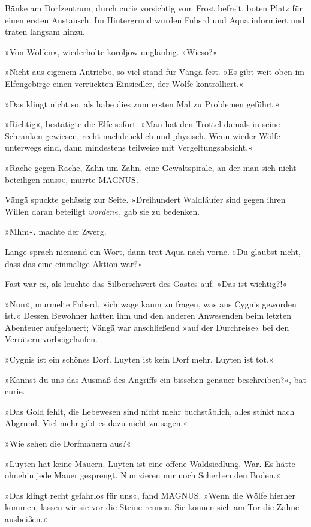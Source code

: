 Bänke am Dorfzentrum, durch curie vorsichtig vom Frost befreit, boten Platz für einen ersten Austausch. Im Hintergrund wurden Fnbsrd und Aqua informiert und traten langsam hinzu.

»Von Wölfen«, wiederholte koroljow ungläubig. »Wieso?«

»Nicht aus eigenem Antrieb«, so viel stand für Vängä fest. »Es gibt weit oben im Elfengebirge einen verrückten Einsiedler, der Wölfe kontrolliert.«

»Das klingt nicht so, als habe dies zum ersten Mal zu Problemen geführt.«

»Richtig«, bestätigte die Elfe sofort. »Man hat den Trottel damals in seine Schranken gewiesen, recht nachdrücklich und physisch. Wenn wieder Wölfe unterwegs sind, dann mindestens teilweise mit Vergeltungsabsicht.«

»Rache gegen Rache, Zahn um Zahn, eine Gewaltspirale, an der man sich nicht beteiligen muss«, murrte MAGNUS.

Vängä spuckte gehässig zur Seite. »Dreihundert Waldläufer sind gegen ihren Willen daran beteiligt \emph{worden}«, gab sie zu bedenken.

»Mhm«, machte der Zwerg.

Lange sprach niemand ein Wort, dann trat Aqua nach vorne. »Du glaubst nicht, dass das eine einmalige Aktion war?«

Fast war es, als leuchte das Silberschwert des Gastes auf. »Das ist wichtig?!«

»Nun«, murmelte Fnbsrd, »ich wage kaum zu fragen, was aus Cygnis geworden ist.« Dessen Bewohner hatten ihm und den anderen Anwesenden beim letzten Abenteuer aufgelauert; Vängä war anschließend »auf der Durchreise« bei den Verrätern vorbeigelaufen.

»Cygnis ist ein schönes Dorf. Luyten ist kein Dorf mehr. Luyten ist tot.«

»Kannst du uns das Ausmaß des Angriffs ein bisschen genauer beschreiben?«, bat curie.

»Das Gold fehlt, die Lebewesen sind nicht mehr buchstäblich, alles stinkt nach Abgrund. Viel mehr gibt es dazu nicht zu sagen.«

»Wie sehen die Dorfmauern aus?«

»Luyten hat keine Mauern. Luyten ist eine offene Waldsiedlung. War. Es hätte ohnehin jede Mauer gesprengt. Nun zieren nur noch Scherben den Boden.«

»Das klingt recht gefahrlos für uns«, fand MAGNUS. »Wenn die Wölfe hierher kommen, lassen wir sie vor die Steine rennen. Sie können sich am Tor die Zähne ausbeißen.«

